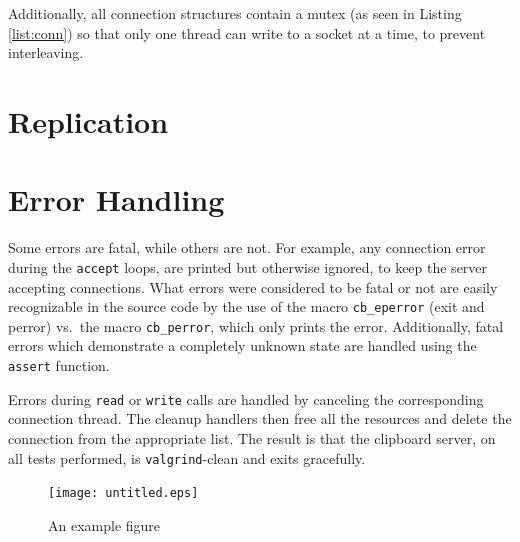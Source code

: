 \documentclass[a4paper, titlepage, english]{article}
\begin{document}
\par
Additionally, all connection structures contain a mutex (as seen in Listing \ref{list:conn}) so that only one thread can write to a socket at a time, to prevent interleaving.

\section{Replication}

\section{Error Handling}
\par
Some errors are fatal, while others are not. For example, any connection error during the \texttt{accept} loops, are printed but otherwise ignored, to keep the server accepting connections. What errors were considered to be fatal or not are easily recognizable in the source code by the use of the macro \texttt{cb\_eperror} (exit and perror) vs.\ the macro \texttt{cb\_perror}, which only prints the error. Additionally, fatal errors which demonstrate a completely unknown state are handled using the \texttt{assert} function.
\par
Errors during \texttt{read} or \texttt{write} calls are handled by canceling the corresponding connection thread. The cleanup handlers then free all the resources and delete the connection from the appropriate list. The result is that the clipboard server, on all tests performed, is \texttt{valgrind}-clean and exits gracefully.
\begin{figure}[h]
	\centering
	\texttt{[image: untitled.eps]}
	\caption{An example figure}
	\label{fig:figure-example}
\end{figure}



\end{document}
